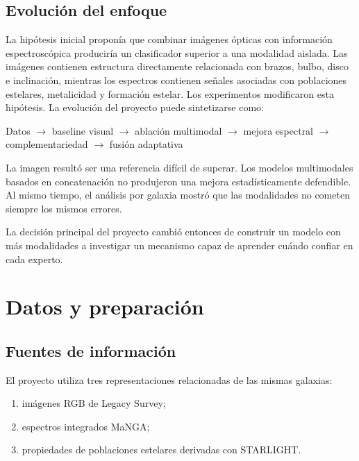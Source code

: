 \documentclass[letterpaper,11pt]{article}
\begin{document}
\subsection{Evolución del enfoque} 

La hipótesis inicial proponía que combinar imágenes ópticas con información espectroscópica produciría un clasificador superior a una modalidad aislada. Las imágenes contienen estructura directamente relacionada con brazos, bulbo, disco e inclinación, mientras los espectros contienen señales asociadas con poblaciones estelares, metalicidad y formación estelar. Los experimentos modificaron esta hipótesis. La evolución del proyecto puede sintetizarse como:

\begin{center} 
  Datos $\rightarrow$ 
  baseline visual $\rightarrow$ 
  ablación multimodal $\rightarrow$ 
  mejora espectral $\rightarrow$ 
  complementariedad $\rightarrow$ 
  fusión adaptativa 
\end{center}

La imagen resultó ser una referencia difícil de superar. Los modelos multimodales basados en concatenación no produjeron una mejora estadísticamente defendible. Al mismo tiempo, el análisis por galaxia mostró que las modalidades no cometen siempre los mismos errores. 

La decisión principal del proyecto cambió entonces de construir un modelo con más modalidades a investigar un mecanismo capaz de aprender cuándo confiar en cada experto.

\section{Datos y preparación} 
\subsection{Fuentes de información}

El proyecto utiliza tres representaciones relacionadas de las mismas galaxias:

\begin{enumerate} 
  \item imágenes RGB de Legacy Survey; 
  \item espectros integrados MaNGA; 
  \item propiedades de poblaciones estelares derivadas con STARLIGHT. 
\end{enumerate}
\end{document}
